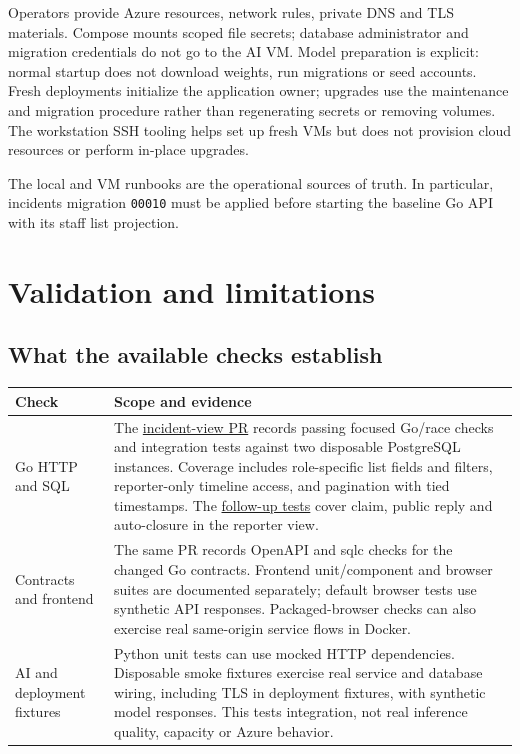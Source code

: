 \documentclass[11pt,a4paper]{article}
\newcommand{\project}{https://github.com/bekadoux/cyberguard}
\newcommand{\code}[1]{\texttt{#1}}
\begin{document}
Operators provide Azure resources, network rules, private DNS and TLS
materials. Compose mounts scoped file secrets; database administrator and
migration credentials do not go to the AI VM. Model preparation is explicit:
normal startup does not download weights, run migrations or seed accounts.
Fresh deployments initialize the application owner; upgrades use the
maintenance and migration procedure rather than regenerating secrets or
removing volumes. The workstation SSH tooling helps set up fresh VMs but
does not provision cloud resources or perform in-place upgrades.

The local and VM runbooks are the operational sources of truth. In
particular, incidents migration \code{00010} must be applied before
starting the baseline Go API with its staff list projection.

\section{Validation and limitations}

\subsection{What the available checks establish}

\begin{center}
\begin{tabularx}{\linewidth}{@{}lY@{}}
\toprule
\textbf{Check} & \textbf{Scope and evidence} \\
\midrule
Go HTTP and SQL &
The \href{\project/pull/15}{incident-view PR} records passing focused
Go/race checks and integration tests against two disposable PostgreSQL
instances. Coverage includes role-specific list fields and filters,
reporter-only timeline access, and pagination with tied timestamps. The
\href{\project/commit/868c79f}{follow-up tests} cover claim, public reply
and auto-closure in the reporter view. \\
\addlinespace
Contracts and frontend &
The same PR records OpenAPI and sqlc checks for the changed Go contracts.
Frontend unit/component and browser suites are documented separately;
default browser tests use synthetic API responses. Packaged-browser
checks can also exercise real same-origin service flows in Docker. \\
\addlinespace
AI and deployment fixtures &
Python unit tests can use mocked HTTP dependencies. Disposable smoke
fixtures exercise real service and database wiring, including TLS in
deployment fixtures, with synthetic model responses. This tests
integration, not real inference quality, capacity or Azure behavior. \\
\bottomrule
\end{tabularx}
\end{center}
\end{document}
